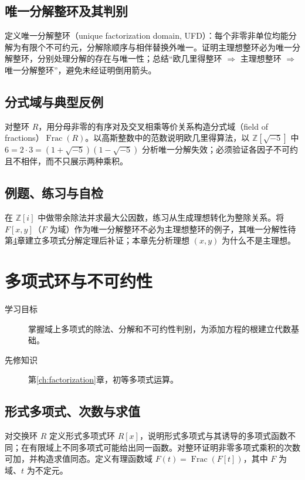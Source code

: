 \documentclass[UTF8,12pt,a4paper,fontset=fandol]{ctexbook}
\begin{document}
\section{唯一分解整环及其判别}
定义唯一分解整环（unique factorization domain, UFD）：每个非零非单位均能分解为有限个不可约元，分解除顺序与相伴替换外唯一。证明主理想整环必为唯一分解整环，分别处理分解的存在与唯一性；总结“欧几里得整环 $\Rightarrow$ 主理想整环 $\Rightarrow$ 唯一分解整环”，避免未经证明倒用箭头。

\section{分式域与典型反例}
对整环 $R$，用分母非零的有序对及交叉相乘等价关系构造分式域（field of fractions）$\operatorname{Frac}(R)$。以高斯整数中的范数说明欧几里得算法，以 $\mathbb Z[\sqrt{-5}]$ 中 $6=2\cdot3=(1+\sqrt{-5})(1-\sqrt{-5})$ 分析唯一分解失效；必须验证各因子不可约且不相伴，而不只展示两种乘积。

\section{例题、练习与自检}
在 $\mathbb Z[i]$ 中做带余除法并求最大公因数，练习从生成理想转化为整除关系。将 $F[x,y]$（$F$ 为域）作为唯一分解整环不必为主理想整环的例子，其唯一分解性待第\ref{ch:polynomials}章建立多项式分解定理后补证；本章先分析理想 $(x,y)$ 为什么不是主理想。

\chapter{多项式环与不可约性}\label{ch:polynomials}

\begin{description}
  \item[学习目标] 掌握域上多项式的除法、分解和不可约性判别，为添加方程的根建立代数基础。
  \item[先修知识] 第\ref{ch:factorization}章，初等多项式运算。
\end{description}

\section{形式多项式、次数与求值}
对交换环 $R$ 定义形式多项式环 $R[x]$，说明形式多项式与其诱导的多项式函数不同；在有限域上不同多项式可能给出同一函数。对整环证明非零多项式乘积的次数可加，并构造求值同态。定义有理函数域 $F(t)=\operatorname{Frac}(F[t])$，其中 $F$ 为域、$t$ 为不定元。
\end{document}
